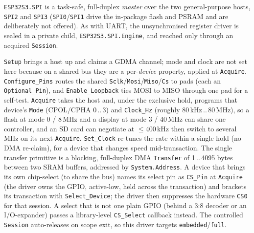 \texttt{ESP32S3.SPI} is a task-safe, full-duplex \emph{master} over the two
general-purpose hosts, \texttt{SPI2} and \texttt{SPI3} (\texttt{SPI0}/\texttt{SPI1}
drive the in-package flash and PSRAM and are deliberately not offered). As with
UART, the unsynchronised register driver is sealed in a private child,
\texttt{ESP32S3.SPI.Engine}, and reached only through an acquired
\texttt{Session}.

\texttt{Setup} brings a host up and claims a GDMA channel; mode and clock are not
set here because on a shared bus they are a per-\emph{device} property, applied at
\texttt{Acquire}. \texttt{Configure\_Pins} routes the shared
\texttt{Sclk}/\texttt{Mosi}/\texttt{Miso}/\texttt{Cs} to pads (each an
\texttt{Optional\_Pin}), and \texttt{Enable\_Loopback} ties MOSI to MISO through
one pad for a self-test. \texttt{Acquire} takes the host and, under the exclusive
hold, programs that device's \texttt{Mode} (CPOL/CPHA 0\,..\,3) and \texttt{Clock\_Hz}
(roughly 80\,kHz\,..\,80\,MHz), so a flash at mode 0 / 8\,MHz and a display at
mode 3 / 40\,MHz can share one controller, and an SD card can negotiate at
$\le$400\,kHz then switch to several MHz on its next \texttt{Acquire}.
\texttt{Set\_Clock} re-tunes the rate within a single hold (no DMA re-claim), for a
device that changes speed mid-transaction. The single transfer primitive is a
blocking, full-duplex DMA \texttt{Transfer} of 1\,..\,4095 bytes between two SRAM
buffers, addressed by \texttt{System.Address}. A device that brings its own
chip-select (to share the bus) names its select pin as \texttt{CS\_Pin} at
\texttt{Acquire} (the driver owns the GPIO, active-low, held across the
transaction) and brackets its transaction with \texttt{Select\_Device}; the driver
then suppresses the hardware \texttt{CS0} for that session. A select that is not one
plain GPIO (behind a 3:8 decoder or an I/O-expander) passes a library-level
\texttt{CS\_Select} callback instead. The controlled \texttt{Session} auto-releases
on scope exit, so this driver targets \texttt{embedded}/\texttt{full}.

